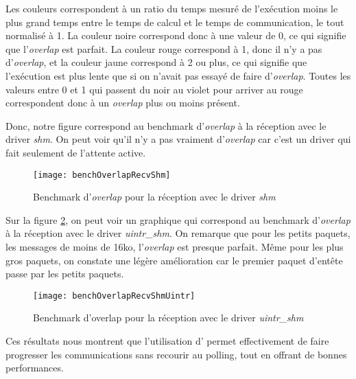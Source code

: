 Les couleurs correspondent à un ratio du temps mesuré de l'exécution moins le plus grand temps entre le temps de calcul et le temps de communication, le tout normalisé à 1.
La couleur noire correspond donc à une valeur de 0, ce qui signifie que l'\emph{overlap} est parfait.
La couleur rouge correspond à 1, donc il n'y a pas d'\emph{overlap},
et la couleur jaune correspond à 2 ou plus, ce qui signifie que l'exécution est plus lente que si on n'avait pas essayé de faire d'\emph{overlap}.
Toutes les valeurs entre 0 et 1 qui passent du noir au violet pour arriver au rouge correspondent donc à un \emph{overlap} plus ou moins présent.

Donc, notre figure correspond au benchmark d'\emph{overlap} à la réception avec le driver \emph{shm}.
On peut voir qu'il n'y a pas vraiment d'\emph{overlap} car c'est un driver qui fait seulement de l'attente active.

\begin{figure}[H]
  \texttt{[image: benchOverlapRecvShm]}
  \caption{Benchmark d'\emph{overlap} pour la réception avec le driver \emph{shm}}
  \label{fig:benchOverlapRecvShm}
\end{figure}

Sur la figure \ref{fig:benchOverlapRecvShmUintr}, on peut voir un graphique qui correspond au benchmark d'\emph{overlap} à la réception avec le driver \emph{uintr_shm}.
On remarque que pour les petits paquets, les messages de moins de 16ko, l'\emph{overlap} est presque parfait.
Même pour les plus gros paquets, on constate une légère amélioration car le premier paquet d'entête passe par les petits paquets.
\begin{figure}[H]
  \texttt{[image: benchOverlapRecvShmUintr]}
  \caption{Benchmark d'overlap pour la réception avec le driver \emph{uintr_shm}}
  \label{fig:benchOverlapRecvShmUintr}
\end{figure}


Ces résultats nous montrent que l'utilisation d'\uintr{} permet effectivement de faire progresser les communications sans recourir au polling,
tout en offrant de bonnes performances.

